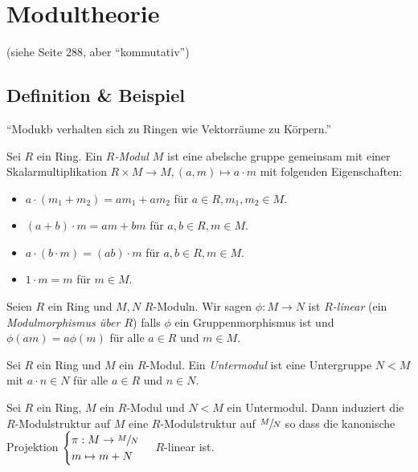 \graphicspath{{Images/}}

\chapter{Modultheorie}
(siehe Seite $288$, aber \enquote{kommutativ})

\section{Definition \& Beispiel}
\enquote{Modukb verhalten sich zu Ringen wie Vektorräume zu Körpern.}

\begin{definition}
	Sei $R$ ein Ring. Ein \emph{$R$-Modul $M$} ist eine abelsche gruppe gemeinsam mit einer Skalarmultiplikation $R \times M \to M, (a,m) \mapsto a \cdot m$
	mit folgenden Eigenschaften:
	\begin{itemize}
		\item $a \cdot (m_1 + m_2) = a m_1 + a m_2$ für $a \in R, m_1,m_2 \in M$.
		\item $(a+b) \cdot m = a m + b m$ für $a,b \in R, m \in M$.
		\item $a \cdot (b \cdot m) = (a b ) \cdot m$ für $a,b \in R, m \in M$.
		\item $1 \cdot m = m$ für $m \in M$.
	\end{itemize}
\end{definition}

\begin{definition}
	Seien $R$ ein Ring und $M,N$ $R$-Moduln. Wir sagen $\phi: M \to N$ ist \emph{$R$-linear} (ein \emph{Modulmorphismus über $R$})
	falls $\phi$ ein Gruppenmorphismus ist und $\phi(a m) = a \phi(m)$ für alle $a \in R$ und $m \in M$.
\end{definition}

\begin{definition}
	Sei $R$ ein Ring und $M$ ein $R$-Modul. Ein \emph{Untermodul} ist eine Untergruppe $N < M$ mit $a \cdot n \in N$ für alle $a \in R$ und $n \in N$.
\end{definition}

\begin{lemma}
	Sei $R$ ein Ring, $M$ ein $R$-Modul und $N < M$ ein Untermodul. Dann induziert die $R$-Modulstruktur auf $M$ eine $R$-Modulstruktur auf $\sfrac{M}{N}$ so dass
	die kanonische Projektion $\begin{cases}
		\pi: M \to \sfrac{M}{N}\\ m \mapsto m+N
	\end{cases}$ $R$-linear ist.
\end{lemma}



